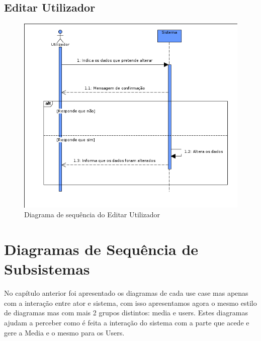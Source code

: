 \documentclass[a4paper]{report}
\begin{document}
\section{Editar Utilizador}
\begin{figure}[H]
	\centering 
    \includegraphics[width=\textwidth]{images/edituserSeq.png}  
    \caption{Diagrama de sequência do Editar Utilizador}
\end{figure}

\chapter{Diagramas de Sequência de Subsistemas}
No capítulo anterior foi apresentado os diagramas de cada use case mas apenas
com a interação entre ator e sistema, com isso apresentamos agora o mesmo estilo
de diagramas mas com mais 2 grupos distintos: media e users. Estes diagramas
ajudam a perceber como é feita a interação do sistema com a parte que acede e
gere a Media e o mesmo para os Users.
\end{document}
